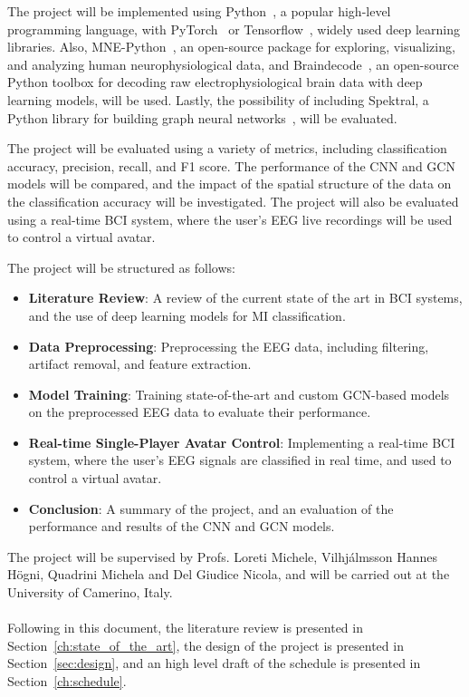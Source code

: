 The project will be implemented using Python~\cite{10.5555/1593511}, a popular high-level programming language, with PyTorch~\cite{NEURIPS2019_9015} or Tensorflow~\cite{tensorflow2015-whitepaper}, widely used deep learning libraries.
Also, MNE-Python~\cite{larson_2024_10519948, 10.3389/fnins.2013.00267}, an open-source package for exploring, visualizing, and analyzing human neurophysiological data, and Braindecode~\cite{HBM:HBM23730}, an open-source Python toolbox for decoding raw electrophysiological brain data with deep learning models, will be used.
Lastly, the possibility of including Spektral, a Python library for building graph neural networks~\cite{grattarola2020graph}, will be evaluated.

The project will be evaluated using a variety of metrics, including classification accuracy, precision, recall, and F1 score.
The performance of the CNN and GCN models will be compared, and the impact of the spatial structure of the data on the classification accuracy will be investigated.
The project will also be evaluated using a real-time BCI system, where the user's EEG live recordings will be used to control a virtual avatar.

The project will be structured as follows:
\begin{itemize}
    \item \textbf{Literature Review}: A review of the current state of the art in BCI systems, and the use of deep learning models for MI classification.
    \item \textbf{Data Preprocessing}: Preprocessing the EEG data, including filtering, artifact removal, and feature extraction.
    \item \textbf{Model Training}: Training state-of-the-art and custom GCN-based models on the preprocessed EEG data to evaluate their performance.
    \item \textbf{Real-time Single-Player Avatar Control}: Implementing a real-time BCI system, where the user's EEG signals are classified in real time, and used to control a virtual avatar.
    \item \textbf{Conclusion}: A summary of the project, and an evaluation of the performance and results of the CNN and GCN models.
\end{itemize}

The project will be supervised by Profs. Loreti Michele, Vilhj\'almsson Hannes H\"ogni, Quadrini Michela and Del Giudice Nicola, and will be carried out at the University of Camerino, Italy.
\\\\

Following in this document, the literature review is presented in Section~\ref{ch:state_of_the_art}, the design of the project is presented in Section~\ref{sec:design}, and an high level draft of the schedule is presented in Section~\ref{ch:schedule}.
